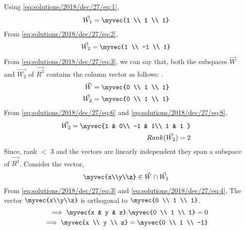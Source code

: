 Using \eqref{eq:solutions/2018/dec/27/eq:1},
\begin{align}
\vec{W_1}=\myvec{1 \\ 1 \\ 1} \label{eq:solutions/2018/dec/27/eq:5}
\end{align}
From \eqref{eq:solutions/2018/dec/27/eq:2},
\begin{align}
 \vec{W_2}=\myvec{1 \\ -1 \\ 1} \label{eq:solutions/2018/dec/27/eq:6}
\end{align}
From \eqref{eq:solutions/2018/dec/27/eq:3}, we can say that, both the subspaces $\vec{W}$ and $\vec{W_2}$ of $\vec{R^3}$ contains the column vector as follows: .
\begin{align}
\vec{W}=\myvec{0 \\ 1 \\ 1} \label{eq:solutions/2018/dec/27/eq:7} \\ \vec{W_2}=\myvec{0 \\ 1 \\ 1}  \label{eq:solutions/2018/dec/27/eq:8}
\end{align}
From \eqref{eq:solutions/2018/dec/27/eq:6} and \eqref{eq:solutions/2018/dec/27/eq:8},
\begin{align}
 \vec{W_2} = \myvec{1 & 0\\ -1 & 1\\ 1 & 1 } \label{eq:solutions/2018/dec/27/eq:9}\\ Rank(\vec{W_2})=2
 \label{eq:solutions/2018/dec/27/eq:10}
\end{align}
Since, rank $<$ 3 and the vectors are linearly independent they span a subspace of $\vec{R^3}$. \newline \newline
Consider the vector,
\begin{align}
\myvec{x\\y\\z} \in \vec{W} \cap \vec{W_1}
\end{align} \newline
From \eqref{eq:solutions/2018/dec/27/eq:3} and \eqref{eq:solutions/2018/dec/27/eq:4}, \newline
The vector $\myvec{x\\y\\z}$ is orthogonal to $\myvec{0 \\ 1 \\ 1}$. 
\begin{align}
\implies \myvec{x & y & z}.\myvec{0 \\ 1 \\ 1} =0 \\ \implies \myvec{x \\ y \\ z}=\myvec{0 \\ 1 \\ -1} \label{eq:solutions/2018/dec/27/eq:13}
\end{align}\newpage
